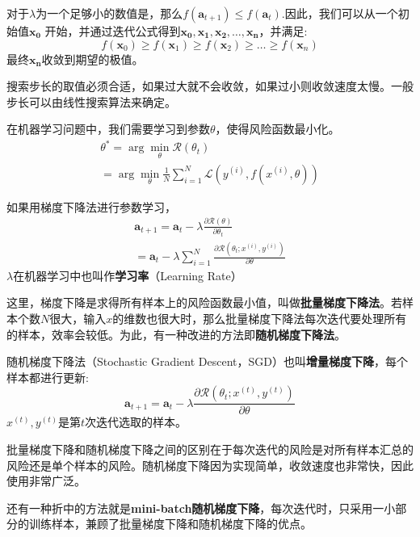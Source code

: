 \documentclass[11pt,fleqn, UTF8]{ctexbook} %
\begin{document}
对于$\lambda$为一个足够小的数值是，那么$f(\boldsymbol{a}_{t+1})\leq f(\boldsymbol{a}_{t})$.因此，我们可以从一个初始值$\boldsymbol{x_0}$ 开始，并通过迭代公式得到$\boldsymbol{x_0}, \boldsymbol{x_1}, \boldsymbol{x_2},\dots,\boldsymbol{x_n}$，并满足:
\begin{equation*}
  f(\boldsymbol{x}_0)\geq f(\boldsymbol{x}_1)\geq f(\boldsymbol{x}_2)\geq \dots\geq f(\boldsymbol{x}_n)
\end{equation*}
最终$\boldsymbol{x_n}$收敛到期望的极值。

搜索步长的取值必须合适，如果过大就不会收敛，如果过小则收敛速度太慢。一般步长可以由线性搜索算法来确定。

在机器学习问题中，我们需要学习到参数$\theta$，使得风险函数最小化。
\begin{gather}\label{3.17}
  \theta^{*}=\arg\min_{\theta}\mathcal{R}(\theta_t)\\
  =\arg\min_{\theta}\frac{1}{N}\sum_{i=1}^{N}\mathcal{L}(y^{(i)},f(x^{(i)},\theta))
\end{gather}

如果用梯度下降法进行参数学习，
\begin{gather}\label{3.19}
  \boldsymbol{a}_{t+1}=\boldsymbol{a}_{t}-\lambda\frac{\partial \mathcal{R}(\theta)}{\partial \theta_t}\\
  =\boldsymbol{a}_{t}-\lambda\sum_{i=1}^N\frac{\partial \mathcal{R}(\theta_t;x^{(i)},y^{(i)})}{\partial \theta}
\end{gather}
$\lambda$在机器学习中也叫作\textbf{学习率}（Learning Rate）

这里，梯度下降是求得所有样本上的风险函数最小值，叫做\textbf{批量梯度下降法}。若样本个数$N$很大，输入$x$的维数也很大时，那么批量梯度下降法每次迭代要处理所有的样本，效率会较低。为此，有一种改进的方法即\textbf{随机梯度下降法}。

随机梯度下降法（Stochastic Gradient Descent，SGD）也叫\textbf{增量梯度下降}，每个样本都进行更新:
\begin{equation}\label{3.20}
  \boldsymbol{a}_{t+1}=\boldsymbol{a}_{t}-\lambda\frac{\partial \mathcal{R}(\theta_t;x^{(t)},y^{(t)})}{\partial \theta}
\end{equation}
$x^{(t)},y^{(t)}$是第$t$次迭代选取的样本。

批量梯度下降和随机梯度下降之间的区别在于每次迭代的风险是对所有样本汇总的风险还是单个样本的风险。随机梯度下降因为实现简单，收敛速度也非常快，因此使用非常广泛。

还有一种折中的方法就是\textbf{mini-batch随机梯度下降}，每次迭代时，只采用一小部分的训练样本，兼顾了批量梯度下降和随机梯度下降的优点。\\
\end{document}
